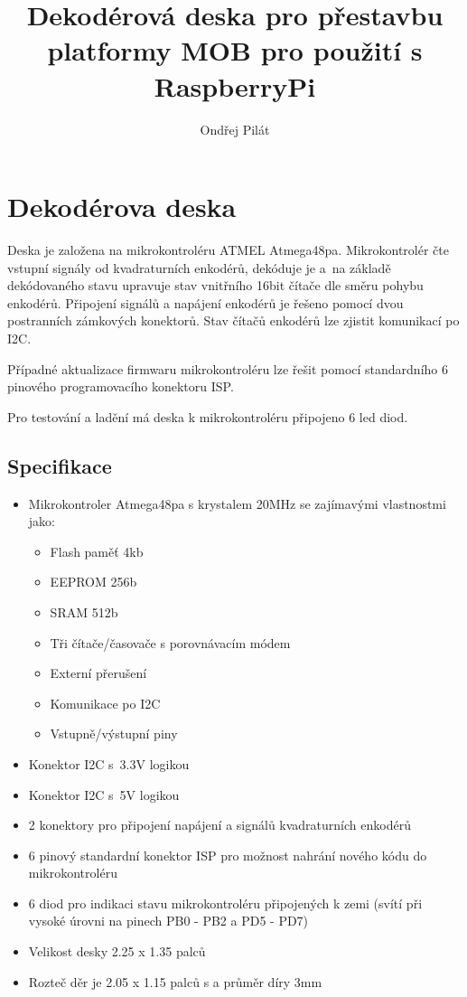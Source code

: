 \documentclass[a4paper,11pt]{article}
\author{Ondřej Pilát}
\title{Dekodérová deska pro přestavbu platformy MOB pro použití s RaspberryPi}
\begin{document}
\maketitle
\newpage
\tableofcontents
\newpage
\section{Dekodérova deska}
Deska je založena na mikrokontroléru ATMEL Atmega48pa. Mikrokontrolér čte vstupní signály od kvadraturních enkodérů, dekóduje je a~na základě dekódovaného stavu upravuje stav vnitřního 16bit čítače dle směru pohybu enkodérů. 
Připojení signálů a napájení enkodérů je řešeno pomocí dvou postranních zámkových konektorů. Stav čítačů enkodérů lze zjistit komunikací po I2C. 

Případné aktualizace firmwaru mikrokontroléru lze řešit pomocí standardního 6 pinového programovacího konektoru ISP.

Pro testování a ladění má deska k mikrokontroléru připojeno 6 led diod. 

\subsection{Specifikace}
\begin{itemize}
	\item Mikrokontroler Atmega48pa s krystalem 20MHz se zajímavými vlastnostmi jako:
		\begin{itemize}
			\item Flash paměť 4kb
			\item EEPROM 256b
			\item SRAM 512b  
			\item Tři čítače/časovače s porovnávacím módem
			\item Externí přerušení
			\item Komunikace po I2C
			\item Vstupně/výstupní piny
		\end{itemize}
	\item Konektor I2C s~3.3V logikou
	\item Konektor I2C s~5V logikou
	\item 2 konektory pro připojení napájení a signálů kvadraturních enkodérů
	\item 6 pinový standardní konektor ISP pro možnost nahrání nového kódu do mikrokontroléru
	\item 6 diod pro indikaci stavu mikrokontroléru připojených k zemi 
	(svítí při vysoké úrovni na pinech PB0 - PB2 a PD5 - PD7)
	\item Velikost desky 2.25 x 1.35 palců
	\item Rozteč děr je 2.05 x 1.15 palců s a průměr díry 3mm
\end{itemize}
\end{document}
